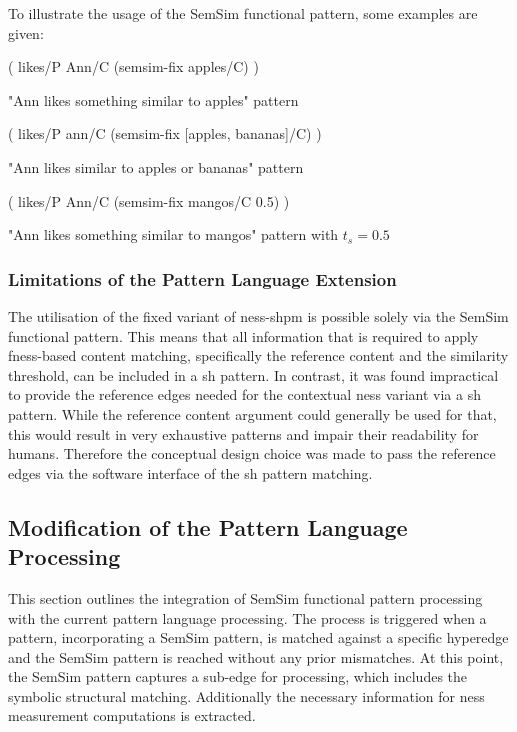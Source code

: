 \documentclass[11pt]{scrreprt}
\begin{document}
To illustrate the usage of the SemSim functional pattern, some examples are given:

\begin{pattern}[h!]
  \normalfont\sffamily
  \centering
  ( likes/P Ann/C (semsim-fix apples/C) )
  \caption{"Ann likes something similar to apples" pattern}
  \label{pat:ann-likes-semsim-aplles}
\end{pattern}

\begin{pattern}[h!]
  \normalfont\sffamily
  \centering
  ( likes/P ann/C (semsim-fix [apples, bananas]/C) )
  \caption{"Ann likes similar to apples or bananas" pattern}
  \label{pat:ann-likes-apples-and-bananas}
\end{pattern}


\begin{pattern}[h!]
  \normalfont\sffamily
  \centering
  ( likes/P Ann/C (semsim-fix mangos/C 0.5) )
  \caption{"Ann likes something similar to mangos" pattern with \(t_s = 0.5\)}
  \label{pat:ann-likes-semsim-aplles}
\end{pattern}


\subsubsection{Limitations of the Pattern Language Extension}
\label{sec:pl-extension-limitations}
The utilisation of the fixed variant of \gls{ness-shpm} is possible solely via the SemSim functional pattern. This means that all information that is required to apply \gls{fness}-based content matching, specifically the reference content and the similarity threshold, can be included in a \gls{sh} pattern. In contrast, it was found impractical to provide the reference edges needed for the contextual \gls{ness} variant via a \gls{sh} pattern. While the reference content argument could generally be used for that, this would result in very exhaustive patterns and impair their readability for humans. Therefore the conceptual design choice was made to pass the reference edges via the software interface of the \gls{sh} pattern matching.


\subsection{Modification of the Pattern Language Processing}
\label{sec:modifications-pattern-language-processing}
This section outlines the integration of SemSim functional pattern processing with the current pattern language processing. The process is triggered when a pattern, incorporating a SemSim pattern, is matched against a specific hyperedge and the SemSim pattern is reached without any prior mismatches. At this point, the SemSim pattern captures a sub-edge for processing, which includes the symbolic structural matching. 
Additionally the necessary information for \gls{ness} measurement computations is extracted.
\end{document}
